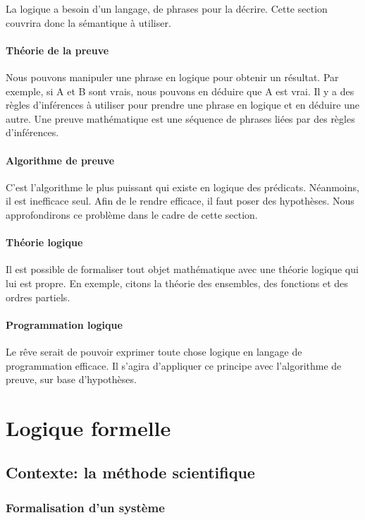 La logique a besoin d'un langage, de phrases pour la décrire. Cette section couvrira donc la sémantique à utiliser.

\subsection*{Théorie de la preuve}

Nous pouvons manipuler une phrase en logique pour obtenir un résultat. Par exemple, si A et B sont vrais, nous pouvons en déduire que A est vrai. Il y a des règles d'inférences à utiliser pour prendre une phrase en logique et en déduire une autre.
Une preuve mathématique est une séquence de phrases liées par des règles d'inférences.

\subsection*{Algorithme de preuve}
C'est l'algorithme le plus puissant qui existe en logique des prédicats. Néanmoins, il est inefficace seul. Afin de le rendre efficace, il faut poser des hypothèses. Nous approfondirons ce problème dans le cadre de cette section. 

\subsection*{Théorie logique}

Il est possible de formaliser tout objet mathématique avec une théorie logique qui lui est propre.  En exemple, citons la théorie des ensembles, des fonctions et des ordres partiels.

\subsection*{Programmation logique}

Le rêve serait de pouvoir exprimer toute chose logique en langage de programmation efficace. Il s'agira d'appliquer ce principe avec l'algorithme de preuve, sur base d'hypothèses.

\part{Logique formelle}
\chapter{Contexte: la méthode scientifique}

\section{Formalisation d'un système}

